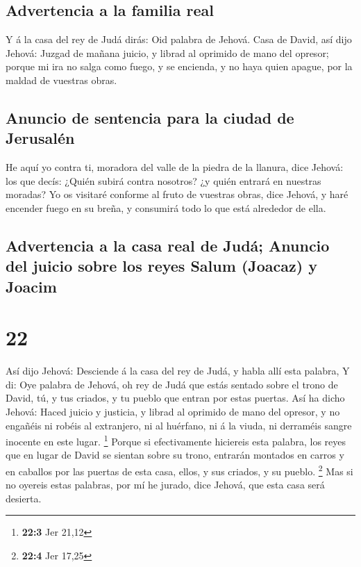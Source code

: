 \hypertarget{advertencia-a-la-familia-real}{%
\subsection{Advertencia a la familia
real}\label{advertencia-a-la-familia-real}}

 Y á la casa del rey de Judá dirás: Oid palabra de
Jehová.  Casa de David, así dijo Jehová: Juzgad de mañana
juicio, y librad al oprimido de mano del opresor; porque mi ira no salga
como fuego, y se encienda, y no haya quien apague, por la maldad de
vuestras obras.

\hypertarget{anuncio-de-sentencia-para-la-ciudad-de-jerusaluxe9n}{%
\subsection{Anuncio de sentencia para la ciudad de
Jerusalén}\label{anuncio-de-sentencia-para-la-ciudad-de-jerusaluxe9n}}

 He aquí yo contra ti, moradora del valle de la piedra de
la llanura, dice Jehová: los que decís: ¿Quién subirá contra nosotros?
¿y quién entrará en nuestras moradas?  Yo os visitaré
conforme al fruto de vuestras obras, dice Jehová, y haré encender fuego
en su breña, y consumirá todo lo que está alrededor de ella.

\hypertarget{advertencia-a-la-casa-real-de-juduxe1-anuncio-del-juicio-sobre-los-reyes-salum-joacaz-y-joacim}{%
\subsection{Advertencia a la casa real de Judá; Anuncio del juicio sobre
los reyes Salum (Joacaz) y
Joacim}\label{advertencia-a-la-casa-real-de-juduxe1-anuncio-del-juicio-sobre-los-reyes-salum-joacaz-y-joacim}}

\hypertarget{section-21}{%
\section{22}\label{section-21}}

 Así dijo Jehová: Desciende á la casa del rey de Judá, y
habla allí esta palabra,  Y di: Oye palabra de Jehová, oh
rey de Judá que estás sentado sobre el trono de David, tú, y tus
criados, y tu pueblo que entran por estas puertas.  Así ha
dicho Jehová: Haced juicio y justicia, y librad al oprimido de mano del
opresor, y no engañéis ni robéis al extranjero, ni al huérfano, ni á la
viuda, ni derraméis sangre inocente en este lugar. \footnote{\textbf{22:3}
  Jer 21,12}  Porque si efectivamente hiciereis esta
palabra, los reyes que en lugar de David se sientan sobre su trono,
entrarán montados en carros y en caballos por las puertas de esta casa,
ellos, y sus criados, y su pueblo. \footnote{\textbf{22:4} Jer 17,25}
 Mas si no oyereis estas palabras, por mí he jurado, dice
Jehová, que esta casa será desierta.

